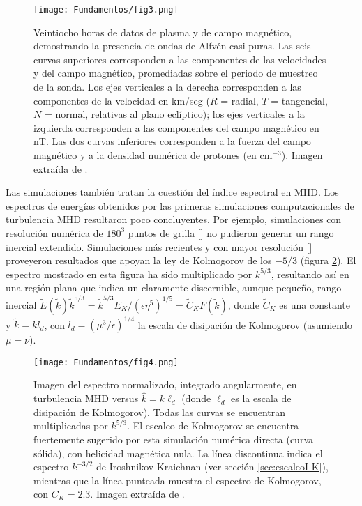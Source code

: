 \begin{figure}[h]
  \centering
  \texttt{[image: Fundamentos/fig3.png]}
  \caption{Veintiocho horas de datos de plasma y de campo magnético,
    demostrando la presencia de ondas de Alfv\'en casi puras. Las seis
    curvas superiores corresponden a las componentes de las
    velocidades y del campo magnético, promediadas sobre el periodo de
    muestreo de la sonda. Los ejes verticales a la derecha
    corresponden a las componentes de la velocidad en km/seg ($R$ =
    radial, $T$ = tangencial, $N$ = normal, relativas al plano
    eclíptico); los ejes verticales a la izquierda corresponden a las
    componentes del campo magnético en nT. Las dos curvas inferiores
    corresponden a la fuerza del campo magnético y a la densidad
    numérica de protones (en cm$^{-3}$). Imagen extraída de
    \cite{belcher_large-amplitude_1971}.}
  \label{fig:equiparticion}
\end{figure}

Las simulaciones también tratan la cuestión del índice espectral en
MHD. Los espectros de energías obtenidos por las primeras simulaciones
computacionales de turbulencia MHD resultaron poco
concluyentes. Por ejemplo, simulaciones con resolución numérica de
$180^3$ puntos de grilla [\cite{politano_current_1995}] no pudieron
generar un rango inercial extendido. Simulaciones más recientes y con
mayor resolución [\cite{biskamp_scaling_2000}] proveyeron resultados
que apoyan la ley de Kolmogorov de los $-5/3$
(figura \ref{fig:normalizedspectrum}). El espectro mostrado en esta
figura ha sido multiplicado por $k^{5/3}$, resultando así en una
región plana que indica un claramente discernible, aunque pequeño,
rango inercial $\tilde{E}(\tilde{k})\tilde{k}^{5/3} =
\tilde{k}^{5/3}E_K/\left(\epsilon\eta^5\right)^{1/5} = \tilde{C}_K
F(\tilde{k})$, donde $\tilde{C}_K$ es una constante y
$\tilde{k}=kl_d$, con $l_d=\left(\mu^3/\epsilon\right)^{1/4}$ la
escala de disipación de Kolmogorov (asumiendo $\mu=\nu$).

\begin{figure}[h]
  \centering
  \texttt{[image: Fundamentos/fig4.png]}
  \caption{Imagen del espectro normalizado, integrado angularmente,
    en turbulencia MHD versus $\hat{k} = k\ell_d$ (donde $\ell_d$ es
    la escala de disipación de Kolmogorov). Todas las curvas se
    encuentran multiplicadas por $k^{5/3}$. El escaleo de Kolmogorov
    se encuentra fuertemente sugerido por esta simulación numérica
    directa (curva sólida), con helicidad magnética nula. La línea
    discontinua indica el espectro $k^{-3/2}$ de Iroshnikov-Kraichnan
    (ver sección \ref{sec:escaleoI-K}), mientras que la línea punteada
    muestra el espectro de Kolmogorov, con $C_K = 2.3$. Imagen
    extraída de \cite{biskamp_scaling_2000}.}
  \label{fig:normalizedspectrum}
\end{figure}

